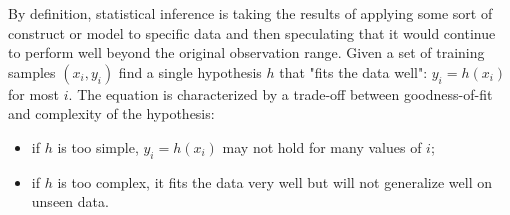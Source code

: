 By deﬁnition, statistical inference is taking the results of applying some sort of construct or model to speciﬁc data and then speculating that it would continue to perform well beyond the original observation range. Given a set of training samples \((x_i,y_i)\) ﬁnd a single hypothesis \(h\) that "fits the data well": \(y_i = h(x_i)\) for most \(i\). The equation is characterized by a trade-off between goodness-of-ﬁt and complexity of the hypothesis:

\begin{itemize}
\item if \(h\) is too simple, \(y_i = h(x_i)\) may not hold for many values of \(i\);
\item if \(h\) is too complex, it fits the data very well but will not generalize well on unseen data.
\end{itemize}
